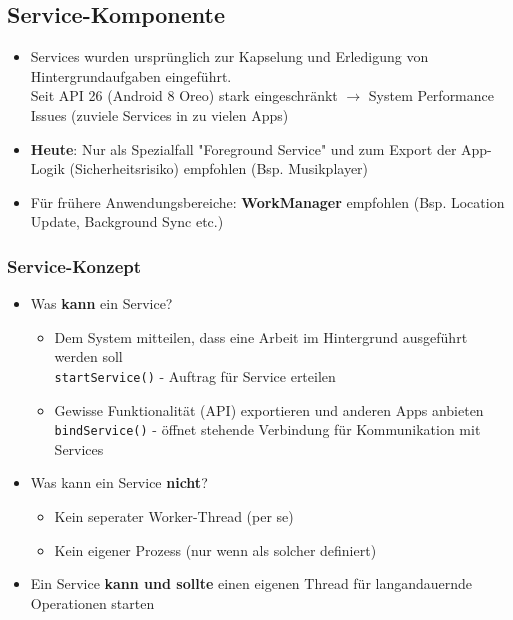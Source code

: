 \documentclass[a4paper]{article}
\begin{document}
	\subsection{Service-Komponente}
	
	\begin{itemize}
		\item Services wurden ursprünglich zur Kapselung und Erledigung von Hintergrundaufgaben eingeführt. \\
		Seit API 26 (Android 8 Oreo) stark eingeschränkt $\rightarrow$ System Performance Issues (zuviele Services in zu vielen Apps)
		
		\item \textbf{Heute}: Nur als Spezialfall "Foreground Service" und zum Export der App-Logik (Sicherheitsrisiko) empfohlen (Bsp. Musikplayer)
		
		\item Für frühere Anwendungsbereiche: \textbf{WorkManager} empfohlen (Bsp. Location Update, Background Sync etc.)
	\end{itemize}

		\subsubsection{Service-Konzept}
	
		\begin{itemize}
			
			\item Was \textbf{kann} ein Service?
			
			\begin{itemize}
				
				\item Dem System mitteilen, dass eine Arbeit im Hintergrund ausgeführt werden soll \\
				\texttt{startService()} - Auftrag für Service erteilen
				
				\item Gewisse Funktionalität (API) exportieren und anderen Apps anbieten \\
				\texttt{bindService()} - öffnet stehende Verbindung für Kommunikation mit Services
				
			\end{itemize}
			
			\item Was kann ein Service \textbf{nicht}?
			
			\begin{itemize}
				
				\item Kein seperater Worker-Thread (per se)
				
				\item Kein eigener Prozess (nur wenn als solcher definiert)
				
			\end{itemize}
		
			\item Ein Service \textbf{kann und sollte} einen eigenen Thread für langandauernde Operationen starten
			
		\end{itemize}
	
\end{document}
